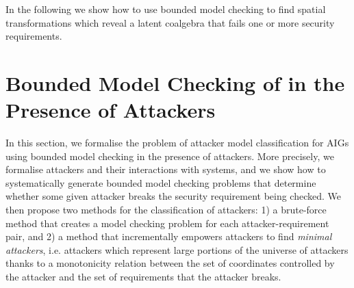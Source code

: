 In the following we show how to use bounded model checking to find spatial transformations which reveal a latent coalgebra that fails one or more security requirements. %

% 




\section{Bounded Model Checking of in the Presence of Attackers}
\label{sec:bmc}
In this section, we %
formalise the problem of attacker model classification for AIGs using bounded model checking in the presence of attackers. More precisely, %
we formalise attackers and their interactions with systems, and we show how to systematically generate bounded model checking problems that determine whether some given attacker breaks the security requirement being checked. We then propose two methods for the classification of attackers: 1) a brute-force method that creates a model checking problem for each attacker-requirement pair, and 2) a method that incrementally empowers attackers to find \emph{minimal attackers}, i.e. attackers which represent large portions of the universe of attackers thanks to a monotonicity relation between the set of coordinates controlled by the attacker and the set of requirements that the attacker breaks. %

